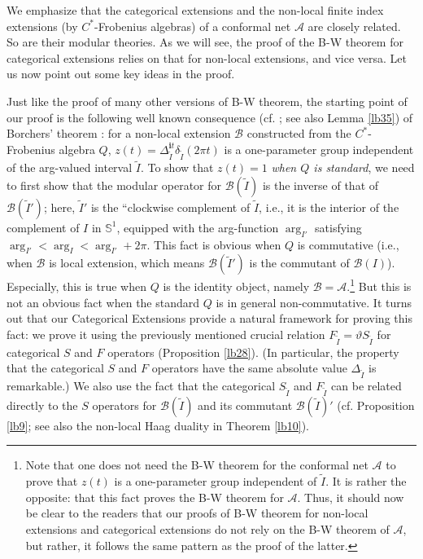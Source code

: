 \documentclass[12pt,a4paper]{article}
\theoremstyle{definition}
\theoremstyle{plain}
\newcommand{\mc}{\mathcal}
\newcommand{\wtd}{\widetilde}
\newcommand{\im}{\mathbf{i}}
\newcommand{\mbb}{\mathbb}
\numberwithin{equation}{section}
\begin{document}
We emphasize that the categorical extensions and the non-local finite index extensions (by $C^*$-Frobenius algebras) of a conformal net $\mc A$ are closely related. So are their modular theories. As we will see, the proof of the B-W theorem for categorical extensions relies on that  for non-local extensions, and vice versa. Let us now point out some key ideas in the proof. 

Just like the proof of many other versions of B-W theorem, the starting point of our proof is the following well known  consequence (cf. \cite{ALR01,LR04}; see also Lemma \ref{lb35}) of Borchers' theorem \cite{Bor92}: for a non-local extension $\mc B$ constructed from the $C^*$-Frobenius algebra $Q$, $z(t)=\Delta_{\wtd I}^{\im t}\delta_{\wtd I}(2\pi t)$ is a one-parameter group independent of the arg-valued interval $\wtd I$. To show that $z(t)=1$ \emph{when $Q$ is standard}, we need to first show that the modular operator for $\mc B(\wtd I)$ is the inverse of that of $\mc B(\wtd I')$; here, $\wtd I'$ is the ``clockwise complement of $\wtd I$, i.e., it is the interior of the complement of $I$ in $\mbb S^1$, equipped with the arg-function $\arg_{I'}$ satisfying $\arg_{I'}<\arg_I<\arg_{I'}+2\pi$. This fact is obvious when $Q$ is commutative (i.e., when $\mc B$ is local extension, which means $\mc B(\wtd I')$ is the commutant of $\mc B(I)$). Especially, this is true when $Q$ is the identity object, namely $\mc B=\mc A$.\footnote{Note that one does not need the B-W theorem for the conformal net $\mc A$ to prove that $z(t)$ is a one-parameter group independent of $\wtd I$. It is rather the opposite: that this fact proves the B-W theorem for $\mc A$. Thus, it should now be clear to the readers that our proofs of B-W theorem for non-local extensions and categorical extensions do not rely on the B-W theorem of $\mc A$, but rather, it follows the same pattern as the proof of the latter.} But this is not an obvious fact when the standard $Q$ is in general non-commutative. It turns out that our Categorical Extensions provide a natural framework for proving this fact: we prove it using the previously mentioned crucial relation $F_{\wtd I}=\vartheta S_{\wtd I}$ for categorical $S$ and $F$ operators (Proposition \ref{lb28}). (In particular, the property that the categorical $S$ and $F$ operators have the same absolute value $\Delta_{\wtd I}$ is remarkable.) We also use the fact that the categorical $S_{\wtd I}$ and $F_{\wtd I}$ can be related directly to the $S$ operators for $\mc B(\wtd I)$ and its commutant $\mc B(\wtd I)'$ (cf. Proposition \ref{lb9}; see also the non-local Haag duality in Theorem \ref{lb10}). 
\end{document}
